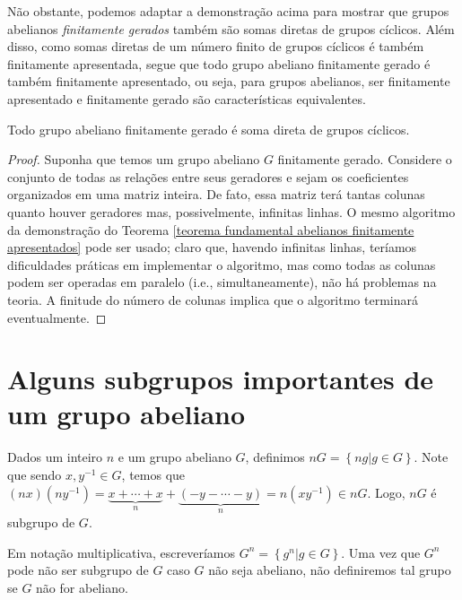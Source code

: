     	\par\vspace{0.3cm} Não obstante, podemos adaptar a demonstração acima para mostrar que grupos 
    	abelianos \textit{finitamente gerados} também são somas diretas de grupos cíclicos. Além disso, 
    	como somas diretas de um número finito de grupos cíclicos é também finitamente apresentada, segue 
    	que todo grupo abeliano finitamente gerado é também finitamente apresentado, ou seja, para grupos
    	abelianos, ser finitamente apresentado e finitamente gerado são características equivalentes.
    	\begin{theorem}
    	\label{teorema fundamental abelianos finitamente gerados}
    		Todo grupo abeliano finitamente gerado é soma direta de grupos cíclicos.
    	\end{theorem}
    	\begin{proof}
    		Suponha que temos um grupo abeliano $G$ finitamente gerado. Considere o conjunto de todas 
    		as relações entre seus geradores e sejam os coeficientes organizados em uma matriz inteira. 
    		De fato, essa matriz terá tantas colunas quanto houver geradores mas, possivelmente, infinitas 
    		linhas. O mesmo algoritmo da demonstração do 
    		Teorema \eqref{teorema fundamental abelianos finitamente apresentados} pode ser usado; claro que,
    		havendo infinitas linhas, teríamos dificuldades práticas em implementar o algoritmo, mas como 
    		todas as colunas podem ser operadas em paralelo (i.e., simultaneamente), não há problemas na teoria.
    		A finitude do número de colunas implica que o algoritmo terminará eventualmente.
    	\end{proof}
	\section{Alguns subgrupos importantes de um grupo abeliano}
    	Dados um inteiro $n$ e um grupo abeliano $G$, definimos $nG = \left\{ ng\vert g\in G \right\}$. 
    	Note que sendo $x,y^{-1}\in G$, temos que 
    	$(nx)(ny^{-1}) = \underbrace{x+\cdots+x}_{n} + \underbrace{(-y-\cdots-y)}_{n} = n(xy^{-1})\in nG$. 
    	Logo, $nG$ é subgrupo de $G$. 
    	
    	\par\vspace{0.3cm} Em notação multiplicativa, escreveríamos $G^n = \left\{ g^n\vert g\in G \right\}$. 
    	Uma vez que $G^n$ pode não ser subgrupo de $G$ caso $G$ não seja abeliano, não definiremos tal grupo 
    	se $G$ não for abeliano.
    	
